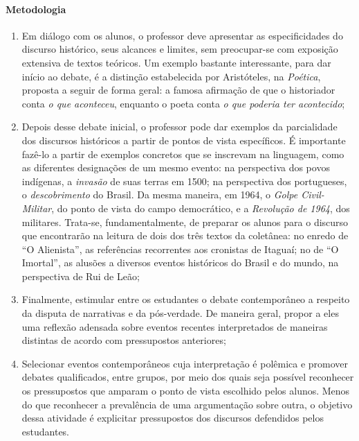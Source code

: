\documentclass{extarticle}
\begin{document}
\paragraph{Metodologia}
\begin{enumerate}
\item Em diálogo com os alunos, o professor deve apresentar as
especificidades do discurso histórico, seus alcances e limites, sem
preocupar-se com exposição extensiva de textos teóricos. Um exemplo
bastante interessante, para dar início ao debate, é a distinção
estabelecida por Aristóteles, na \emph{Poética}, proposta a seguir de
forma geral: a famosa afirmação de que o historiador conta \emph{o que
aconteceu}, enquanto o poeta conta \emph{o que poderia ter acontecido};

\item Depois desse debate inicial, o professor pode dar exemplos da
parcialidade dos discursos históricos a partir de pontos de vista
específicos. É importante fazê-lo a partir de exemplos concretos que se
inscrevam na linguagem, como as diferentes designações de um mesmo
evento: na perspectiva dos povos indígenas, a \emph{invasão} de suas
terras em 1500; na perspectiva dos portugueses, o \emph{descobrimento}
do Brasil. Da mesma maneira, em 1964, o \emph{Golpe Civil-Militar}, do
ponto de vista do campo democrático, e a \emph{Revolução de 1964}, dos
militares. Trata-se, fundamentalmente, de preparar os alunos para o
discurso que encontrarão na leitura de dois dos três textos da
coletânea: no enredo de ``O Alienista'', as referências recorrentes aos
cronistas de Itaguaí; no de ``O Imortal'', as alusões a diversos eventos
históricos do Brasil e do mundo, na perspectiva de Rui de Leão;

\item Finalmente, estimular entre os estudantes o debate contemporâneo a
respeito da disputa de narrativas e da pós-verdade. De maneira geral,
propor a eles uma reflexão adensada sobre eventos recentes interpretados
de maneiras distintas de acordo com pressupostos anteriores;

\item Selecionar eventos contemporâneos cuja interpretação é polêmica e
promover debates qualificados, entre grupos, por meio dos quais seja
possível reconhecer os pressupostos que amparam o ponto de vista
escolhido pelos alunos. Menos do que reconhecer a prevalência de uma
argumentação sobre outra, o objetivo dessa atividade é explicitar
pressupostos dos discursos defendidos pelos estudantes.
\end{enumerate}
\end{document}
